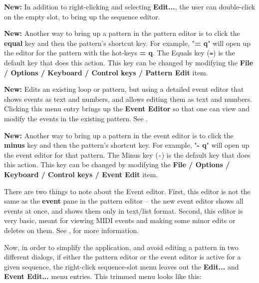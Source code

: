    \textbf{New:}
   In addition to right-clicking and selecting \textbf{Edit...}, the user can
   double-click on the empty slot, to bring up the sequence editor.

   \textbf{New:}
   Another way to bring up a pattern in the pattern editor is to
   click the \textbf{equal} key and then the pattern's shortcut key.
   For example, "\textbf{= q}" will open up the editor for the pattern with the
   hot-keys \textbf{= q}.
   The Equals key (\texttt{=}) is the default key that does this action.
   This key can be changed by modifying the
   \textbf{File / Options / Keyboard / Control keys / Pattern Edit} item.

   \textbf{New:}
   Edits an existing loop or pattern, but using a detailed event editor that
   shows events as text and numbers, and allows editing them as text and
   numbers.
   Clicking this menu entry brings up the \textbf{Event Editor}
   so that one can view and modify the events in the existing pattern.
   See .

   \textbf{New:}
   Another way to bring up a pattern in the event editor is to
   click the \textbf{minus} key and then the pattern's shortcut key.
   For example, "\textbf{- q}" will open up the event editor for that pattern.
   The Minus key (\texttt{-}) is the default key that does this action.
   This key can be changed by modifying the
   \textbf{File / Options / Keyboard / Control keys / Event Edit} item.

   There are two things to note about the Event editor.
   First, this editor is not the same as the \textbf{event} pane in the pattern
   editor -- the new event editor shows all events at once, and shows them only
   in text/list format.  Second, this editor is very basic, meant for viewing
   MIDI events and making some minor edits or deletes on them.
   See , for more information.

   Now, in order to simplify the application, and avoid editing a pattern in
   two different dialogs, if either the pattern editor or the event editor is
   active for a given sequence, the right-click sequence-slot menu leaves out
   the \textbf{Edit...} and \textbf{Event Edit...} menu entries.
   This trimmed menu looks like this:


